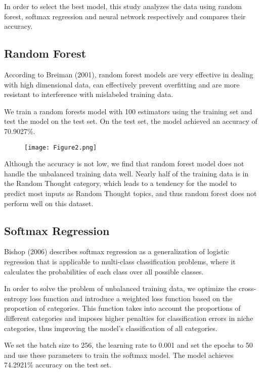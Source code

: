 \documentclass[a4paper, twocolumn]{article}
\begin{document}
In order to select the best model, this study analyzes the data using random forest, softmax regression and neural network respectively and compares their accuracy.

\subsection{Random Forest}

According to Breiman (2001), random forest models are very effective in dealing with high dimensional data, can effectively prevent overfitting and are more resistant to interference with mislabeled training data.

We train a random forests model with 100 estimators using the training set and test the model on the test set. On the test set, the model achieved an accuracy of 70.9027\%.

\begin{figure}[ht]
\begin{center}
\texttt{[image: Figure2.png]}
\end{center}
\end{figure}

Although the accuracy is not low, we find that random forest model does not handle the unbalanced training data well. Nearly half of the training data is in the Random Thought category, which leads to a tendency for the model to predict most inputs as Random Thought topics, and thus random forest does not perform well on this dataset.

\subsection{Softmax Regression}

Bishop (2006) describes softmax regression as a generalization of logistic regression that is applicable to multi-class classification problems, where it calculates the probabilities of each class over all possible classes.

In order to solve the problem of unbalanced training data, we optimize the cross-entropy loss function and introduce a weighted loss function based on the proportion of categories. This function takes into account the proportions of different categories and imposes higher penalties for classification errors in niche categories, thus improving the model's classification of all categories.

We set the batch size to 256, the learning rate to 0.001 and set the epochs to 50 and use these parameters to train the softmax model. The model achieves 74.2921\% accuracy on the test set.
\end{document}

